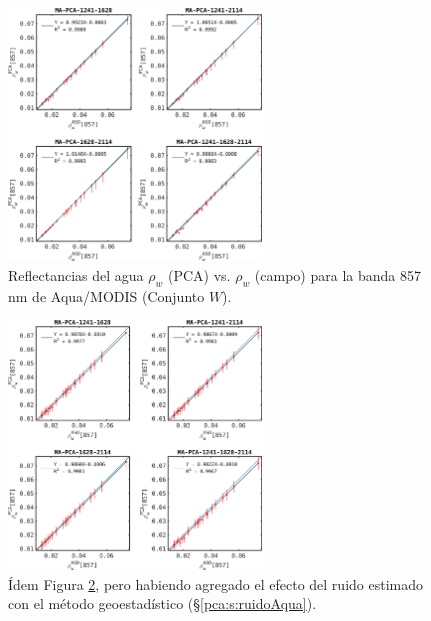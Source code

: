         \begin{figure}
        \centering
        \includegraphics[width=0.6\textwidth]{pca/figures/rhoW_Tc_MA_band_857_MC_1.png}
        \caption[Reflectancias del agua (PCA vs. campo) para la banda 857 nm de Aqua/MODIS.]{Reflectancias del agua $\rho_{w}$ (PCA) vs. $\rho_{w}$ (campo) para la banda 857 nm de Aqua/MODIS (Conjunto $W$).}
        \label{pca:rhoW_Tc_MA_band_857_MC_1}
        \end{figure}

        \begin{figure}
        \centering
        \includegraphics[width=0.6\textwidth]{pca/figures/rhoW_Tc_MA_band_857_MC_30.png}
        \caption[Reflectancias del agua (PCA vs. campo) para la banda 857 nm de Aqua/MODIS, pero habiendo agregado el efecto del ruido estimado con el método geoestadístico.]{Ídem Figura \ref{pca:rhoW_Tc_MA_band_857_MC_30}, pero habiendo agregado el efecto del ruido estimado con el método geoestadístico (\S \ref{pca:s:ruidoAqua}).}
        \label{pca:rhoW_Tc_MA_band_857_MC_30}
        \end{figure}

